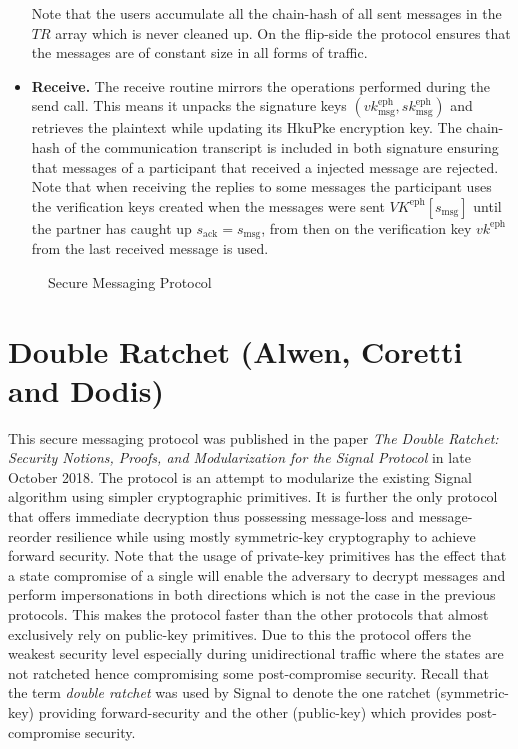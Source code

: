 \documentclass[11pt,a4paper,twoside,openright,bibliography=totoc]{scrbook}
\renewcommand{\t}{\text} %
\begin{document}
\begin{itemize}
  Note that the users accumulate all the chain-hash of all sent
  messages in the $TR$ array which is never cleaned up. On the flip-side
  the protocol ensures that the messages are of constant size in all
  forms of traffic.
\item \textbf{Receive.} The receive routine mirrors the operations performed
  during the send call. This means it unpacks the signature keys
  $(vk_\t{msg}^\t{eph},sk_\t{msg}^\t{eph})$ and retrieves the plaintext while
  updating its HkuPke encryption key. The chain-hash
  of the communication transcript is included in both signature ensuring
  that messages of a participant that received a injected message are rejected.
  Note that when receiving the replies to some messages the participant
  uses the verification keys created when the messages were sent
  $VK^\t{eph}[s_\t{msg}]$ until
  the partner has caught up $s_\t{ack} = s_\t{msg}$, from then on
  the verification key $vk^\t{eph}$ from the last received message is used.
\end{itemize}

\begin{figure}[p]
  \centering
  \setlength{\fboxsep}{10pt}
  \scalebox{0.9}{%
    \fbox{%
      
    } 
  }
  \caption{Secure Messaging Protocol}
  \label{fig:secmsg}
\end{figure}

\clearpage

\section[Alwen, Coretti and Dodis]
{Double Ratchet (Alwen, Coretti and Dodis)~\cite{alwen2018double}}
\label{sec:alwen-coretti-dodis}

This secure messaging protocol was published in the paper \textit{The
Double Ratchet: Security Notions, Proofs, and Modularization for the
Signal Protocol} in late October 2018. The protocol is an attempt to
modularize the existing Signal algorithm using simpler cryptographic
primitives. It is further the only protocol that offers immediate
decryption thus possessing message-loss and message-reorder resilience
while using mostly symmetric-key cryptography to achieve forward security.
Note that the usage of private-key primitives has the effect that
a state compromise of a single will enable the adversary to
decrypt messages and perform impersonations in both directions which
is not the case in the previous protocols.
This makes the protocol faster than the
other protocols that almost exclusively rely on public-key primitives.
Due to this the protocol offers the weakest security level especially
during unidirectional traffic where the states are not ratcheted hence
compromising some post-compromise security. Recall that the term
\textit{double ratchet} was used by Signal to denote the one ratchet
(symmetric-key)
providing forward-security and the other (public-key) which provides post-compromise
security.
\end{document}
